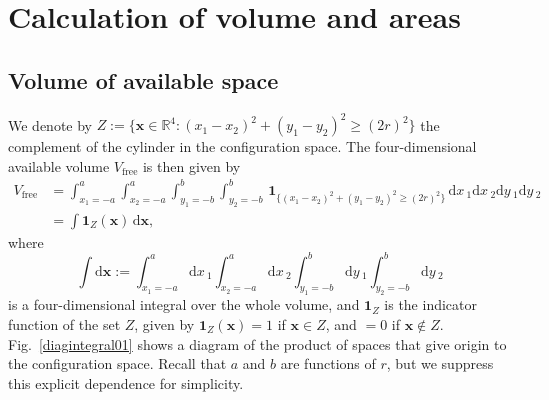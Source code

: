 \documentclass[superscriptaddress,pre,reprint,showpacs,onecolumn]{revtex4-1}
\newcommand{\rd}[1]{\mathrm{d}{#1} \,}
\newcommand{\indicatorsymbol}{\mathbf{1}}
\newcommand{\indicator}[1]{\indicatorsymbol_{ \{   #1 \} } }
\begin{document}
\section{Calculation of volume and areas}


\subsection{Volume of available space}


We denote by $Z := \{ \mathbf{x} \in \mathbb{R}^4: (x_1-x_2)^2 + (y_1-y_2)^2 \ge (2r)^2 \}$ 
the complement of the cylinder in the configuration space.
The four-dimensional available volume $V_\text{free}$ is then given by
\begin{align}\label{volindic}
V_\text{free} &= 
\int_{x_1 = -a}^a  \int_{x_2 = -a}^a  \int_{y_1 = -b}^b \int_{y_2 = -b}^b
 \, \indicator{ (x_1-x_2)^2 + (y_1-y_2)^2 \ge (2r)^2 } \,
\rd x_1 \rd x_2 \rd y_1 \rd y_2 \\
&=
\int \indicatorsymbol_Z(\mathbf{x}) \, \mathrm{d} \mathbf{x},
\end{align}
where
$$ \int  \mathrm{d} \mathbf{x} :=  \int_{x_1 = -a}^a \rd x_1  \int_{x_2 = -a}^a \rd x_2
\int_{y_1 = -b}^b \rd y_1 \int_{y_2 = -b}^b  \rd y_2 $$
is a four-dimensional integral over the whole volume, and 
$\indicatorsymbol_Z$ is the indicator function of the set $Z$, 
given by $\indicatorsymbol_Z (\mathbf{x}) = 1$ if $\mathbf{x} \in Z$, and $=0$ if $\mathbf{x} \notin Z$.
Fig.~\ref{diagintegral01} shows a diagram of the product of
spaces that give origin to the configuration space.
Recall that $a$ and $b$ are functions of $r$, 
but we suppress this explicit dependence for simplicity.
\end{document}
